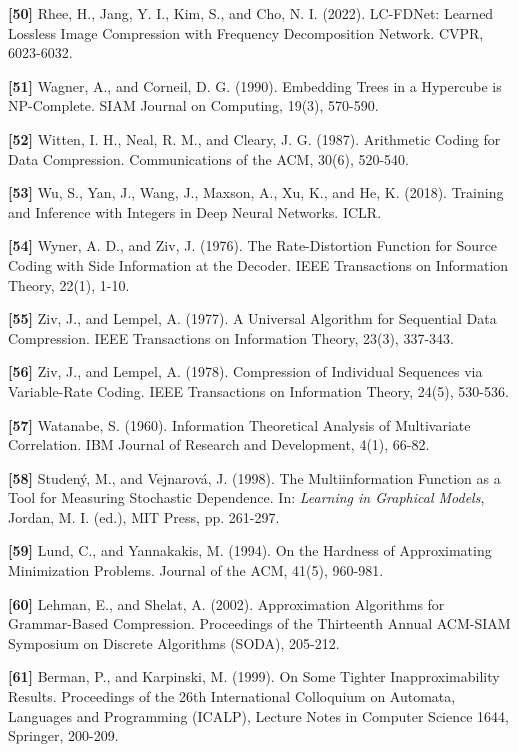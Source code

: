 \documentclass[
]{article}
\begin{document}
\textbf{{[}50{]}} Rhee, H., Jang, Y. I., Kim, S., and Cho, N. I. (2022).
LC-FDNet: Learned Lossless Image Compression with Frequency
Decomposition Network. CVPR, 6023-6032.

\textbf{{[}51{]}} Wagner, A., and Corneil, D. G. (1990). Embedding Trees in a Hypercube
is NP-Complete. SIAM Journal on Computing, 19(3), 570-590.

\textbf{{[}52{]}} Witten, I. H., Neal, R. M., and Cleary, J. G. (1987).
Arithmetic Coding for Data Compression. Communications of the ACM,
30(6), 520-540.

\textbf{{[}53{]}} Wu, S., Yan, J., Wang, J., Maxson, A., Xu, K., and He,
K. (2018). Training and Inference with Integers in Deep Neural Networks.
ICLR.

\textbf{{[}54{]}} Wyner, A. D., and Ziv, J. (1976). The Rate-Distortion
Function for Source Coding with Side Information at the Decoder. IEEE
Transactions on Information Theory, 22(1), 1-10.

\textbf{{[}55{]}} Ziv, J., and Lempel, A. (1977). A Universal Algorithm
for Sequential Data Compression. IEEE Transactions on Information
Theory, 23(3), 337-343.

\textbf{{[}56{]}} Ziv, J., and Lempel, A. (1978). Compression of
Individual Sequences via Variable-Rate Coding. IEEE Transactions on
Information Theory, 24(5), 530-536.

\textbf{{[}57{]}} Watanabe, S. (1960). Information Theoretical
Analysis of Multivariate Correlation. IBM Journal of Research and
Development, 4(1), 66-82.

\textbf{{[}58{]}} Studen\'y, M., and Vejnarov\'a, J. (1998). The
Multiinformation Function as a Tool for Measuring Stochastic
Dependence. In: \emph{Learning in Graphical Models}, Jordan, M. I.
(ed.), MIT Press, pp. 261-297.

\textbf{{[}59{]}} Lund, C., and Yannakakis, M. (1994). On the
Hardness of Approximating Minimization Problems. Journal of the ACM,
41(5), 960-981.

\textbf{{[}60{]}} Lehman, E., and Shelat, A. (2002). Approximation
Algorithms for Grammar-Based Compression. Proceedings of the
Thirteenth Annual ACM-SIAM Symposium on Discrete Algorithms (SODA),
205-212.

\textbf{{[}61{]}} Berman, P., and Karpinski, M. (1999). On Some
Tighter Inapproximability Results. Proceedings of the 26th
International Colloquium on Automata, Languages and Programming
(ICALP), Lecture Notes in Computer Science 1644, Springer, 200-209.
\end{document}
